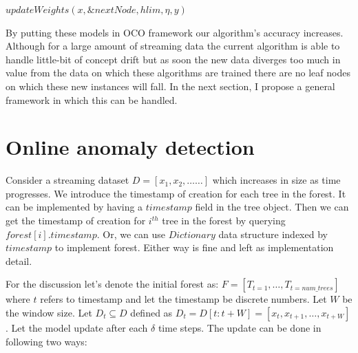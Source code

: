 \vspace{1em}
\begin{algorithm}[H]
    \caption{$updateWeights(x, T, \eta, y)$}
    \label{alg:update-weights-pidforest}
    \DontPrintSemicolon
    \SetAlgoLined


    
    $updateWeights(x, \&nextNode, hlim, \eta, y)$
\end{algorithm}
\pagebreak

By putting these models in OCO framework our algorithm's accuracy increases. 
Although for a large amount of streaming data the current algorithm is able to handle little-bit of concept drift but as soon the new data diverges too much in value from the data on which these algorithms are trained there are no leaf nodes on which these new instances will fall.
In the next section, I propose a general framework in which this can be handled.

\section{Online anomaly detection}
\label{sec:online-anomaly-detection}


Consider a streaming dataset $D = [x_1, x_2, \dots \dots  ]$ which increases in size as time progresses.
We introduce the timestamp of creation for each tree in the forest.
It can be implemented by having a $timestamp$ field in the tree object.
Then we can get the timestamp of creation for $i^{th}$ tree in the forest by querying $forest[i].timestamp$.
Or, we can use $Dictionary$ data structure indexed by $timestamp$ to implement forest.
Either way is fine and left as implementation detail.

For the discussion let's denote the initial forest as: $F = [T_{t=1}, \dots, T_{t=num\_trees}]$ where $t$ refers to timestamp and let the timestamp be discrete numbers.
Let $W$ be the window size.
Let $D_{t} \subseteq D$ defined as $D_{t} = D[t:t+W] = [x_t, x_{t+1}, \dots, x_{t+W}]$.
Let the model update after each $\delta$ time steps.
The update can be done in following two ways:

